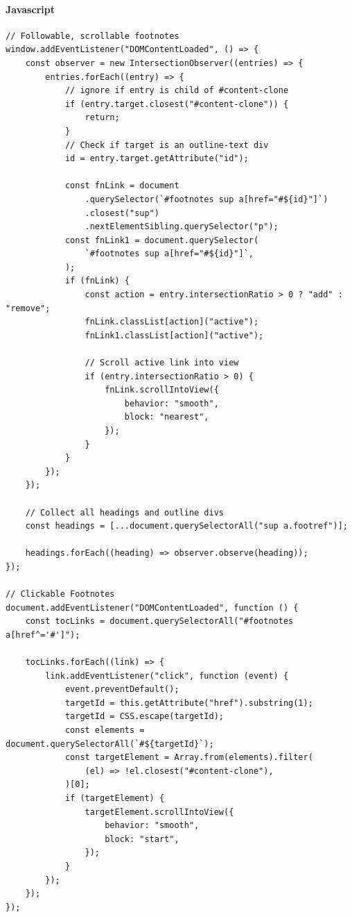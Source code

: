\documentclass[11pt]{article}
\begin{document}
\paragraph{Javascript}
\label{sec:org6a8b3da}
\begin{verbatim}
// Followable, scrollable footnotes
window.addEventListener("DOMContentLoaded", () => {
    const observer = new IntersectionObserver((entries) => {
        entries.forEach((entry) => {
            // ignore if entry is child of #content-clone
            if (entry.target.closest("#content-clone")) {
                return;
            }
            // Check if target is an outline-text div
            id = entry.target.getAttribute("id");

            const fnLink = document
                .querySelector(`#footnotes sup a[href="#${id}"]`)
                .closest("sup")
                .nextElementSibling.querySelector("p");
            const fnLink1 = document.querySelector(
                `#footnotes sup a[href="#${id}"]`,
            );
            if (fnLink) {
                const action = entry.intersectionRatio > 0 ? "add" : "remove";
                fnLink.classList[action]("active");
                fnLink1.classList[action]("active");

                // Scroll active link into view
                if (entry.intersectionRatio > 0) {
                    fnLink.scrollIntoView({
                        behavior: "smooth",
                        block: "nearest",
                    });
                }
            }
        });
    });

    // Collect all headings and outline divs
    const headings = [...document.querySelectorAll("sup a.footref")];

    headings.forEach((heading) => observer.observe(heading));
});

// Clickable Footnotes
document.addEventListener("DOMContentLoaded", function () {
    const tocLinks = document.querySelectorAll("#footnotes a[href^='#']");

    tocLinks.forEach((link) => {
        link.addEventListener("click", function (event) {
            event.preventDefault();
            targetId = this.getAttribute("href").substring(1);
            targetId = CSS.escape(targetId);
            const elements = document.querySelectorAll(`#${targetId}`);
            const targetElement = Array.from(elements).filter(
                (el) => !el.closest("#content-clone"),
            )[0];
            if (targetElement) {
                targetElement.scrollIntoView({
                    behavior: "smooth",
                    block: "start",
                });
            }
        });
    });
});
\end{verbatim}
\end{document}
